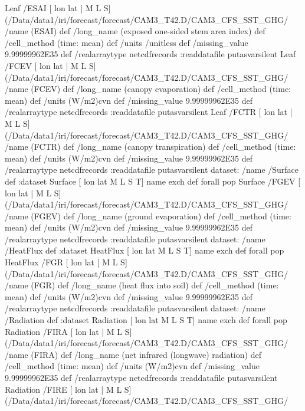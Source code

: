 \begin{ingrid}
Leaf /ESAI{
[ lon lat | M L S] (/Data/data1/iri/forecast/forecast/CAM3_T42.D/CAM3_CFS_SST_GHG/%
/name (ESAI) def
 /long_name (exposed one-sided stem area index) def
 /cell_method (time: mean) def
 /units /unitless def
 /missing_value 9.99999962E35 def
 /realarraytype netcdfrecords :readdatafile
}putasvarsilent
Leaf /FCEV{
[ lon lat | M L S] (/Data/data1/iri/forecast/forecast/CAM3_T42.D/CAM3_CFS_SST_GHG/%
/name (FCEV) def
 /long_name (canopy evaporation) def
 /cell_method (time: mean) def
 /units (W/m2)cvn def
 /missing_value 9.99999962E35 def
 /realarraytype netcdfrecords :readdatafile
}putasvarsilent
Leaf /FCTR{
[ lon lat | M L S] (/Data/data1/iri/forecast/forecast/CAM3_T42.D/CAM3_CFS_SST_GHG/%
/name (FCTR) def
 /long_name (canopy transpiration) def
 /cell_method (time: mean) def
 /units (W/m2)cvn def
 /missing_value 9.99999962E35 def
 /realarraytype netcdfrecords :readdatafile
}putasvarsilent
dataset: /name /Surface def :dataset
Surface [ lon lat M L S T] {name exch def} forall pop
Surface /FGEV{
[ lon lat | M L S] (/Data/data1/iri/forecast/forecast/CAM3_T42.D/CAM3_CFS_SST_GHG/%
/name (FGEV) def
 /long_name (ground evaporation) def
 /cell_method (time: mean) def
 /units (W/m2)cvn def
 /missing_value 9.99999962E35 def
 /realarraytype netcdfrecords :readdatafile
}putasvarsilent
dataset: /name /HeatFlux def :dataset
HeatFlux [ lon lat M L S T] {name exch def} forall pop
HeatFlux /FGR{
[ lon lat | M L S] (/Data/data1/iri/forecast/forecast/CAM3_T42.D/CAM3_CFS_SST_GHG/%
/name (FGR) def
 /long_name (heat flux into soil) def
 /cell_method (time: mean) def
 /units (W/m2)cvn def
 /missing_value 9.99999962E35 def
 /realarraytype netcdfrecords :readdatafile
}putasvarsilent
dataset: /name /Radiation def :dataset
Radiation [ lon lat M L S T] {name exch def} forall pop
Radiation /FIRA{
[ lon lat | M L S] (/Data/data1/iri/forecast/forecast/CAM3_T42.D/CAM3_CFS_SST_GHG/%
/name (FIRA) def
 /long_name (net infrared (longwave) radiation) def
 /cell_method (time: mean) def
 /units (W/m2)cvn def
 /missing_value 9.99999962E35 def
 /realarraytype netcdfrecords :readdatafile
}putasvarsilent
Radiation /FIRE{
[ lon lat | M L S] (/Data/data1/iri/forecast/forecast/CAM3_T42.D/CAM3_CFS_SST_GHG/%
}
\end{ingrid}
